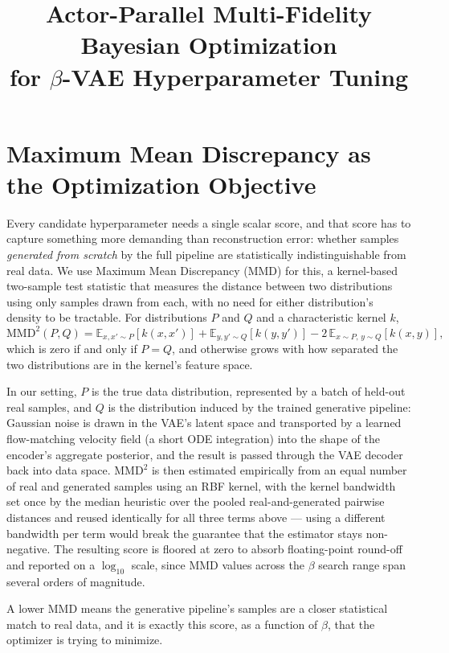 \documentclass[11pt]{article}
\title{Actor-Parallel Multi-Fidelity Bayesian Optimization\\ for $\beta$-VAE Hyperparameter Tuning}
\author{}
\date{}
\begin{document}
\maketitle

\section{Maximum Mean Discrepancy as the Optimization Objective}
\label{sec:mmd}

Every candidate hyperparameter needs a single scalar score, and that score
has to capture something more demanding than reconstruction error: whether
samples \emph{generated from scratch} by the full pipeline are
statistically indistinguishable from real data. We use Maximum Mean
Discrepancy (MMD) for this, a kernel-based two-sample test statistic that
measures the distance between two distributions using only samples drawn
from each, with no need for either distribution's density to be tractable.
For distributions $P$ and $Q$ and a characteristic kernel $k$,
\begin{equation}
\mathrm{MMD}^2(P, Q) = \mathbb{E}_{x, x' \sim P}[k(x, x')]
  + \mathbb{E}_{y, y' \sim Q}[k(y, y')]
  - 2\,\mathbb{E}_{x \sim P,\, y \sim Q}[k(x, y)],
\end{equation}
which is zero if and only if $P = Q$, and otherwise grows with how
separated the two distributions are in the kernel's feature space.

In our setting, $P$ is the true data distribution, represented by a batch
of held-out real samples, and $Q$ is the distribution induced by the
trained generative pipeline: Gaussian noise is drawn in the VAE's latent
space and transported by a learned flow-matching velocity field (a
short ODE integration) into the shape of the encoder's aggregate
posterior, and the result is passed through the VAE decoder back into
data space. $\mathrm{MMD}^2$ is then estimated empirically from an equal
number of real and generated samples using an RBF kernel, with the
kernel bandwidth set once by the median heuristic over the pooled
real-and-generated pairwise distances and reused identically for all
three terms above — using a different bandwidth per term would break the
guarantee that the estimator stays non-negative. The resulting score is
floored at zero to absorb floating-point round-off and reported on a
$\log_{10}$ scale, since MMD values across the $\beta$ search range span
several orders of magnitude.

A lower MMD means the generative pipeline's samples are a
closer statistical match to real data, and it is exactly this score,
as a function of $\beta$, that the optimizer is trying to minimize.
\end{document}
